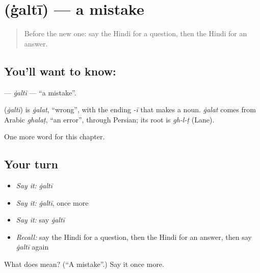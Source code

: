 \section[\texorpdfstring{\hi{ग़लती} (ġaltī)}{ग़लती (ġaltī)}]{ (ġaltī) — a mistake}

\label{lesson:HI-C189-galti}



\begin{quote}
Before the new one: say the Hindi for a question, then the Hindi for an answer.
\end{quote}

\subsection*{You'll want to know: }
\textbf{} — \emph{ġaltī} — \textquotedblleft{}a mistake\textquotedblright{}.

\begin{cousinweb}
\textbf{} (\emph{ġaltī}) is \emph{ġalat}, \textquotedblleft{}wrong\textquotedblright{}, with the ending \emph{-ī} that makes a noun. \emph{ġalat} comes from Arabic \emph{ghalaṭ}, \textquotedblleft{}an error\textquotedblright{}, through Persian; its root is \emph{gh-l-ṭ} (Lane).
\end{cousinweb}

\begin{grammarlens}[title={What you've built}]
One more word for this chapter.
\end{grammarlens}

\subsection*{Your turn}
\begin{itemize}
\raggedright
  \item \emph{Say it:} \emph{ġaltī}
  \item \emph{Say it:} \emph{ġaltī}, once more
  \item \emph{Say it:} say \emph{ġaltī}
  \item \emph{Recall:} say the Hindi for a question, then the Hindi for an answer, then say \emph{ġaltī} again
\end{itemize}

\begin{tcolorbox}[breakable,colback=teal!4,colframe=teal!35!black,title={Before you move on}]
What does  mean? (\textquotedblleft{}A mistake\textquotedblright{}.) Say it once more.
\end{tcolorbox}
